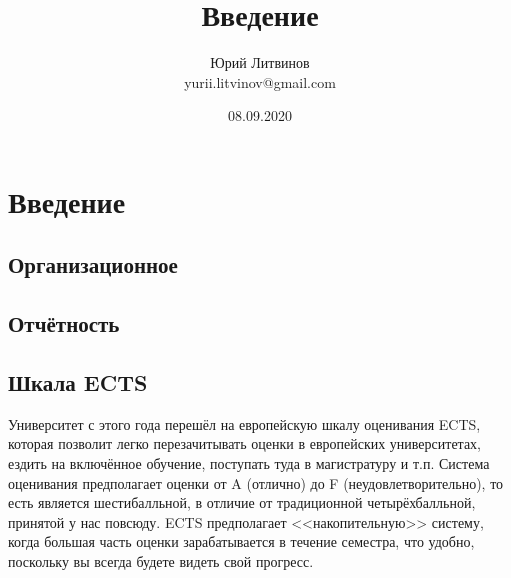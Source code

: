 \documentclass[a5paper]{article}
\title{Введение}
\author{Юрий Литвинов\\\small{yurii.litvinov@gmail.com}}
\date{08.09.2020}
\begin{document}
\maketitle
\thispagestyle{empty}

\section{Введение}

\subsection{Организационное}


\subsection{Отчётность}


\subsection{Шкала ECTS}

Университет с этого года перешёл на европейскую шкалу оценивания ECTS, которая позволит легко перезачитывать оценки в европейских университетах, ездить на включённое обучение, поступать туда в магистратуру и т.п. Система оценивания предполагает оценки от A (отлично) до F (неудовлетворительно), то есть является шестибалльной, в отличие от традиционной четырёхбалльной, принятой у нас повсюду. ECTS предполагает <<накопительную>> систему, когда большая часть оценки зарабатывается в течение семестра, что удобно, поскольку вы всегда будете видеть свой прогресс.
\end{document}
